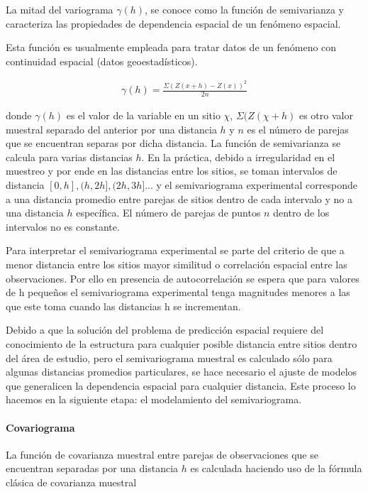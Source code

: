 La mitad del variograma $\gamma(h)$, se conoce como la función de semivarianza y caracteriza las propiedades de dependencia espacial de un fenómeno espacial. 

Esta función es usualmente empleada para tratar datos de un fenómeno con continuidad espacial (datos geoestadísticos). 

\begin{equation*}
\begin{aligned}
   \gamma(h)  = \frac{\Sigma(Z(x + h) - Z(x))^2}{2n}
\end{aligned}
\end{equation*}


donde $\gamma(h) $ es el valor de la variable en un sitio $\chi$, $\Sigma(Z(\chi + h) $ es otro valor muestral separado del anterior por una distancia $h$ y $n$ es el número de parejas que se encuentran separas por dicha distancia. La función de semivarianza se calcula para varias distancias $h$. En la práctica, debido a irregularidad en el muestreo y por ende en las distancias entre los sitios, se toman intervalos de distancia $[0,h], (h,2h], (2h, 3h]$... y el semivariograma experimental corresponde a una distancia promedio entre parejas de sitios dentro de cada intervalo y no a una distancia $h$ específica. El número de parejas de puntos $n$ dentro de los intervalos no es constante.

Para interpretar el semivariograma experimental se parte del criterio de que a menor distancia entre los sitios mayor similitud o correlación espacial entre las observaciones. Por ello en presencia de autocorrelación se espera que para valores de h pequeños el semivariograma experimental tenga magnitudes menores a las que este toma cuando las distancias h se incrementan.

Debido a que la solución del problema de predicción espacial requiere del conocimiento de la estructura para cualquier posible distancia entre sitios dentro del área de estudio, pero el semivariograma muestral es calculado sólo para algunas distancias promedios particulares, se hace necesario el ajuste de modelos que generalicen la dependencia espacial para cualquier distancia. Este proceso lo hacemos en la siguiente etapa: el modelamiento del semivariograma. 




\paragraph{Covariograma}
La función de covarianza muestral entre parejas de observaciones que se encuentran separadas por
una distancia $h$ es calculada haciendo uso de la fórmula clásica de covarianza muestral 

